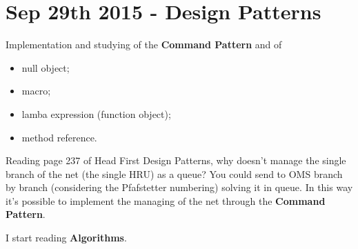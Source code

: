 \section{Sep 29th 2015 - Design Patterns}

Implementation and studying of the \textbf{Command Pattern} and of

\begin{itemize}
\item null object;
\item macro;
\item lamba expression (function object);
\item method reference.
\end{itemize}

Reading page 237 of Head First Design Patterns, why doesn't manage the
single branch of the net (the single HRU) as a queue? You could send
to OMS branch by branch (considering the Pfafstetter numbering)
solving it in queue. In this way it's possible to implement the
managing of the net through the \textbf{Command Pattern}.

\par\medskip

I start reading \textbf{Algorithms}.
